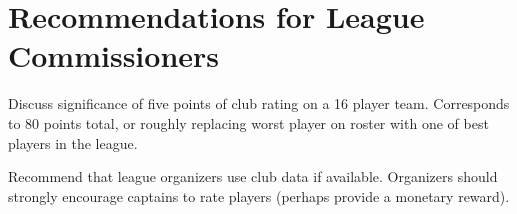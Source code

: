 \section{Recommendations for League Commissioners}

Discuss significance of five points of club rating on a 16 player team.  Corresponds to 80 points total, or roughly replacing worst player on roster with one of best players in the league.

Recommend that league organizers use club data if available.  Organizers should strongly encourage captains to rate players (perhaps provide a monetary reward).